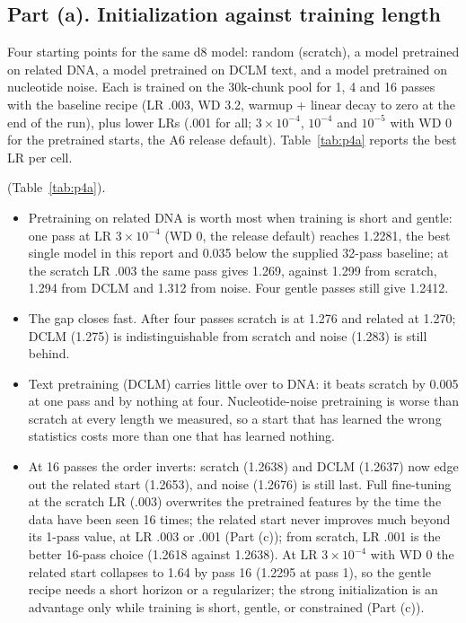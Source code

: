 \subsection*{Part (a). Initialization against training length}

 Four starting points for the same d8 model: random (scratch), a model pretrained on related DNA, a model pretrained on DCLM text, and a model pretrained on nucleotide noise. Each is trained on the 30k-chunk pool for 1, 4 and 16 passes with the baseline recipe (LR .003, WD 3.2, warmup + linear decay to zero at the end of the run), plus lower LRs (.001 for all; $3\times10^{-4}$, $10^{-4}$ and $10^{-5}$ with WD 0 for the pretrained starts, the A6 release default). Table~\ref{tab:p4a} reports the best LR per cell.

 (Table~\ref{tab:p4a}).

\begin{itemize}
\item Pretraining on related DNA is worth most when training is short and gentle: one pass at LR $3\times10^{-4}$ (WD 0, the release default) reaches 1.2281, the best single model in this report and 0.035 below the supplied 32-pass baseline; at the scratch LR .003 the same pass gives 1.269, against 1.299 from scratch, 1.294 from DCLM and 1.312 from noise. Four gentle passes still give 1.2412.
\item The gap closes fast. After four passes scratch is at 1.276 and related at 1.270; DCLM (1.275) is indistinguishable from scratch and noise (1.283) is still behind.
\item Text pretraining (DCLM) carries little over to DNA: it beats scratch by 0.005 at one pass and by nothing at four. Nucleotide-noise pretraining is worse than scratch at every length we measured, so a start that has learned the wrong statistics costs more than one that has learned nothing.
\item At 16 passes the order inverts: scratch (1.2638) and DCLM (1.2637) now edge out the related start (1.2653), and noise (1.2676) is still last. Full fine-tuning at the scratch LR (.003) overwrites the pretrained features by the time the data have been seen 16 times; the related start never improves much beyond its 1-pass value, at LR .003 or .001 (Part (c)); from scratch, LR .001 is the better 16-pass choice (1.2618 against 1.2638). At LR $3\times10^{-4}$ with WD 0 the related start collapses to 1.64 by pass 16 (1.2295 at pass 1), so the gentle recipe needs a short horizon or a regularizer; the strong initialization is an advantage only while training is short, gentle, or constrained (Part (c)).
\end{itemize}
